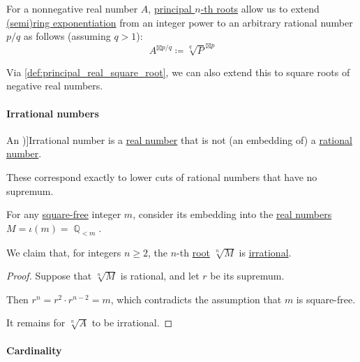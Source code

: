 \begin{definition}\label{def:real_number_rational_exponent}
  For a nonnegative real number \( A \), \hyperref[def:principal_nonnegative_nth_root]{principal \( n \)-th roots} allow us to extend \hyperref[def:semiring/exponentiation]{(semi)ring exponentiation} from an integer power to an arbitrary rational number \( p / q \) as follows (assuming \( q > 1 \)):
  \begin{equation}\label{eq:def:real_number_rational_exponent}
    A^{\boxtimes p / q} \coloneqq \sqrt[q]{ P }^{\boxtimes p}
  \end{equation}
\end{definition}
\begin{comments}
  \item Via \cref{def:principal_real_square_root}, we can also extend this to square roots of negative real numbers.
\end{comments}

\paragraph{Irrational numbers}

\begin{definition}\label{def:irrational_number}
  An \term[ru=иррациональное число (\cite[def. II.1]{Александров1977ОбщаяТопология})]{Irrational number} is a \hyperref[def:real_numbers]{real number} that is not (an embedding of) a \hyperref[def:rational_numbers]{rational number}.
\end{definition}
\begin{comments}
  \item These correspond exactly to lower cuts of rational numbers that have no supremum.
\end{comments}

\begin{proposition}\label{thm:real_nth_root_is_irrational}
  For any \hyperref[def:square_free_element]{square-free} integer \( m \), consider its embedding into the \hyperref[def:real_numbers]{real numbers} \( M = \iota(m) = \BbbQ_{<m} \).

  We claim that, for integers \( n \geq 2 \), the \( n \)-th \hyperref[def:principal_nonnegative_nth_root]{root} \( \sqrt[n]{ M } \) is \hyperref[def:irrational_number]{irrational}.
\end{proposition}
\begin{proof}
  Suppose that \( \sqrt[n]{ M } \) is rational, and let \( r \) be its supremum.

  Then \( r^n = r^2 \cdot r^{n-2} = m \), which contradicts the assumption that \( m \) is square-free.

  It remains for \( \sqrt[n]{ A } \) to be irrational.
\end{proof}

\paragraph{Cardinality}

\begin{proposition}\label{thm:cardinality_of_the_continuum}
\end{proposition}
